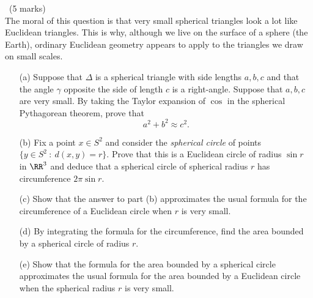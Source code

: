 \documentclass[12pt]{article}
\begin{document}
\begin{question}\ (5 marks)\\
  The moral of this question is that very small spherical triangles look a lot like Euclidean triangles. This is why, although we live on the surface of a sphere (the Earth), ordinary Euclidean geometry appears to apply to the triangles we draw on small scales.
  \begin{enumerate}
  \item[(a)] Suppose that $\Delta$ is a spherical triangle with side lengths $a,b,c$ and that the angle $\gamma$ opposite the side of length $c$ is a right-angle. Suppose that $a,b,c$ are very small. By taking the Taylor expansion of $\cos$ in the spherical Pythagorean theorem, prove that
    \[a^2+b^2\approx c^2.\]
  \item[(b)] Fix a point $x\in S^2$ and consider the {\em spherical circle} of points $\{y\in S^2\ :\ d(x,y)=r\}$. Prove that this is a Euclidean circle of radius $\sin r$ in $\RR^3$ and deduce that a spherical circle of spherical radius $r$ has circumference $2\pi\sin r$. 
  \item[(c)] Show that the answer to part (b) approximates the usual formula for the circumference of a Euclidean circle when $r$ is very small.
  \item[(d)] By integrating the formula for the circumference, find the area bounded by a spherical circle of radius $r$.
  \item[(e)] Show that the formula for the area bounded by a spherical circle approximates the usual formula for the area bounded by a Euclidean circle when the spherical radius $r$ is very small.
  \end{enumerate}
\end{question}
\iffalse
\begin{answer}
  \begin{enumerate}
  \item[(a)] We have $\cos c=\cos a \cos b$, and $\cos x\approx 1-x^2/2$. Therefore
    \[1-c^2/2\approx (1-a^2/2)(1-b^2/2)\approx 1-(a^2+b^2)/2\]
    so $c^2\approx a^2+b^2$.
  \item[(b)] WLOG assume that $x=(1,0,0)$. The points which are a spherical distance $r$ from $x$ are then those points $(a,b,c)$ for which $\cos r=c$, in other words the points $(a,b,\cos r)$ such that $a^2+b^2=1-\cos^2r=\sin^2r$. This is a Euclidean circle of radius $\sin r$.
  \item[(c)] For small $r$, the Taylor expansion of $\sin$ implies that $2\pi\sin r\approx 2\pi r$.
  \item[(d)] Integrating $2\pi\sin s ds$ from $s=0$ to $s=r$ gives $2\pi(1-\cos r)$, which is the area bounded by the spherical circle.
  \item[(e)] For small $r$, this becomes $\approx 2\pi r^2/2=\pi r^2$, using the Taylor expansion of $\cos r$.
  \end{enumerate}
\end{answer}
\fi
\end{document}
